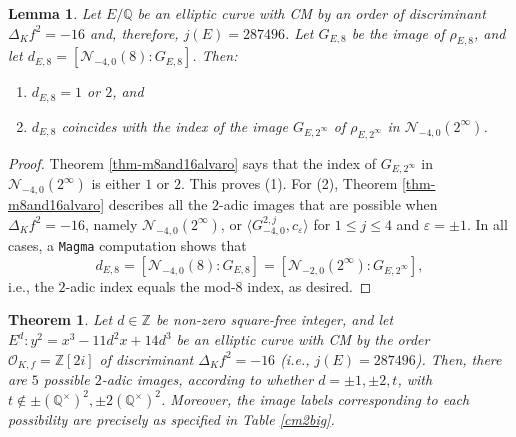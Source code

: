\documentclass[11pt]{amsart}
\newtheorem{lemma}[defn]{Lemma}
\newtheorem{theorem}[defn]{Theorem}
\theoremstyle{definition}
\newcommand{\Q}{\mathbb Q}
\newcommand{\Z}{\mathbb Z}
\newcommand{\Of}{\mathcal{O}_{K,f}}
\begin{document}
\begin{lemma}\label{lem-disc16index}
    Let $E/\Q$ be an elliptic curve with CM by an order of discriminant  $\Delta_K f^2 = -16$ and, therefore, $j(E)=287496$. Let $G_{E,8}$ be the image of $\rho_{E,8}$, and let $d_{E,8}=[\mathcal{N}_{-4,0}(8):G_{E,8}]$. Then:
    \begin{enumerate}
        \item $d_{E,8}=1$ or $2$, and
        \item $d_{E,8}$ coincides with the index of the image $G_{E,2^\infty}$ of $\rho_{E,2^\infty}$ in $\mathcal{N}_{-4,0}(2^{\infty})$.
    \end{enumerate}
\end{lemma}
\begin{proof}
  Theorem \ref{thm-m8and16alvaro} says that the index of $G_{E, 2^{\infty}}$ in $\mathcal{N}_{-4,0}(2^{\infty})$ is either $1$ or $2$. This proves (1). For (2), Theorem \ref{thm-m8and16alvaro} describes all the $2$-adic images that are possible when $\Delta_K f^2=-16$, namely $\mathcal{N}_{-4,0}(2^{\infty})$, or $\langle G_{-4,0}^{2,j},c_\varepsilon \rangle$ for $1\leq j \leq 4$ and $\varepsilon=\pm 1$. In all cases, a \verb|Magma| computation shows that 
    $$d_{E,8}=[\mathcal{N}_{-4,0}(8):G_{E,8}]=[\mathcal{N}_{-2,0}(2^{\infty}):G_{E,2^\infty}],$$ i.e., the $2$-adic index equals the mod-$8$ index, as desired.
\end{proof}

\begin{theorem}\label{thm-16ell2} Let $d\in \Z$ be non-zero square-free integer, and let $E^d:y^2=x^3 - 11 d^2x + 14d^3$ be an elliptic curve with CM by the order $\Of=\Z[2i]$ of discriminant $\Delta_K f^2=-16$ (i.e., $j(E)=287496$). Then, there are $5$ possible $2$-adic images, according to whether $d = \pm 1, \pm 2, t$, with $t \notin \pm (\Q^\times)^2, \pm 2(\Q^\times)^2$. Moreover, the image labels corresponding to each possibility are precisely as specified in Table \ref{cm2big}.
\end{theorem}
\end{document}

